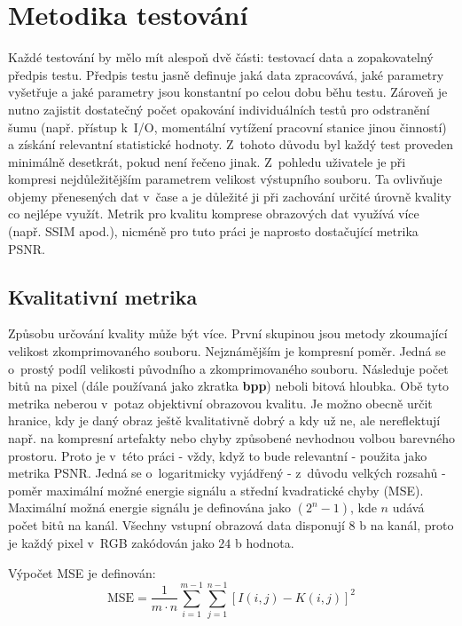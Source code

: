 \chapter{Metodika testování}
\label{mereni}
Každé testování by mělo mít alespoň dvě části: testovací data a zopakovatelný předpis testu. Předpis testu jasně definuje jaká data zpracovává, jaké parametry vyšetřuje a jaké parametry jsou konstantní po celou dobu běhu testu. Zároveň je nutno zajistit dostatečný počet opakování individuálních testů pro odstranění šumu (např. přístup k~I/O, momentální vytížení pracovní stanice jinou činností) a získání relevantní statistické hodnoty. Z~tohoto důvodu byl každý test proveden minimálně desetkrát, pokud není řečeno jinak. Z~pohledu uživatele je při kompresi nejdůležitějším parametrem velikost výstupního souboru. Ta ovlivňuje objemy přenesených dat v~čase a je důležité ji při zachování určité úrovně kvality co nejlépe využít. Metrik pro kvalitu komprese obrazových dat využívá více (např. SSIM apod.), nicméně pro tuto práci je naprosto dostačující metrika PSNR.

\section{Kvalitativní metrika}
Způsobu určování kvality může být více. První skupinou jsou metody zkoumající velikost zkomprimovaného souboru. Nejznámějším je kompresní poměr. Jedná se o~prostý podíl velikosti původního a zkomprimovaného souboru. Následuje počet bitů na pixel (dále používaná jako zkratka \textbf{bpp}) neboli bitová hloubka. Obě tyto metrika neberou v~potaz objektivní obrazovou kvalitu. Je možno obecně určit hranice, kdy je daný obraz ještě kvalitativně dobrý a kdy už ne, ale nereflektují např. na kompresní artefakty nebo chyby způsobené nevhodnou volbou barevného prostoru. Proto je v~této práci - vždy, když to bude relevantní - použita jako metrika PSNR. Jedná se o~logaritmicky vyjádřený - z~důvodu velkých rozsahů - poměr maximální možné energie signálu a střední kvadratické chyby (MSE). Maximální možná energie signálu je definována jako $(2^n-1)$, kde $n$ udává počet bitů na kanál. Všechny vstupní obrazová data disponují $8$ b na kanál, proto je každý pixel v~RGB zakódován jako $24$ b hodnota.

\noindent Výpočet MSE je definován:
\begin{equation}
  \text{MSE} = \frac{1}{m\cdot n} \sum_{i=1}^{m-1}\sum_{j=1}^{n-1} [I(i,j) - K(i,j)]^2
  \label{eq:mse}
\end{equation}

